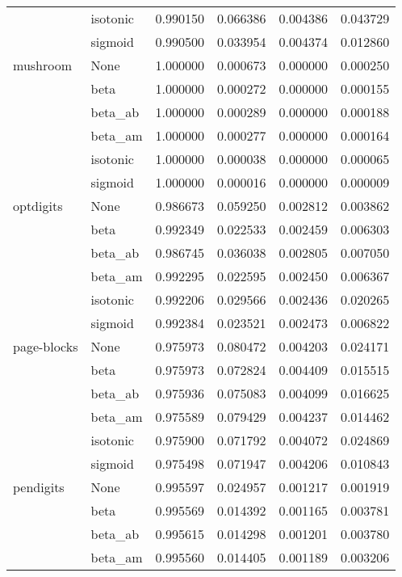 \begin{tabular}{llrrrr}
        & isotonic &  0.990150 &  0.066386 &  0.004386 &  0.043729 \\
        & sigmoid &  0.990500 &  0.033954 &  0.004374 &  0.012860 \\
mushroom & None &  1.000000 &  0.000673 &  0.000000 &  0.000250 \\
        & beta &  1.000000 &  0.000272 &  0.000000 &  0.000155 \\
        & beta\_ab &  1.000000 &  0.000289 &  0.000000 &  0.000188 \\
        & beta\_am &  1.000000 &  0.000277 &  0.000000 &  0.000164 \\
        & isotonic &  1.000000 &  0.000038 &  0.000000 &  0.000065 \\
        & sigmoid &  1.000000 &  0.000016 &  0.000000 &  0.000009 \\
optdigits & None &  0.986673 &  0.059250 &  0.002812 &  0.003862 \\
        & beta &  0.992349 &  0.022533 &  0.002459 &  0.006303 \\
        & beta\_ab &  0.986745 &  0.036038 &  0.002805 &  0.007050 \\
        & beta\_am &  0.992295 &  0.022595 &  0.002450 &  0.006367 \\
        & isotonic &  0.992206 &  0.029566 &  0.002436 &  0.020265 \\
        & sigmoid &  0.992384 &  0.023521 &  0.002473 &  0.006822 \\
page-blocks & None &  0.975973 &  0.080472 &  0.004203 &  0.024171 \\
        & beta &  0.975973 &  0.072824 &  0.004409 &  0.015515 \\
        & beta\_ab &  0.975936 &  0.075083 &  0.004099 &  0.016625 \\
        & beta\_am &  0.975589 &  0.079429 &  0.004237 &  0.014462 \\
        & isotonic &  0.975900 &  0.071792 &  0.004072 &  0.024869 \\
        & sigmoid &  0.975498 &  0.071947 &  0.004206 &  0.010843 \\
pendigits & None &  0.995597 &  0.024957 &  0.001217 &  0.001919 \\
        & beta &  0.995569 &  0.014392 &  0.001165 &  0.003781 \\
        & beta\_ab &  0.995615 &  0.014298 &  0.001201 &  0.003780 \\
        & beta\_am &  0.995560 &  0.014405 &  0.001189 &  0.003206 \\

\end{tabular}

